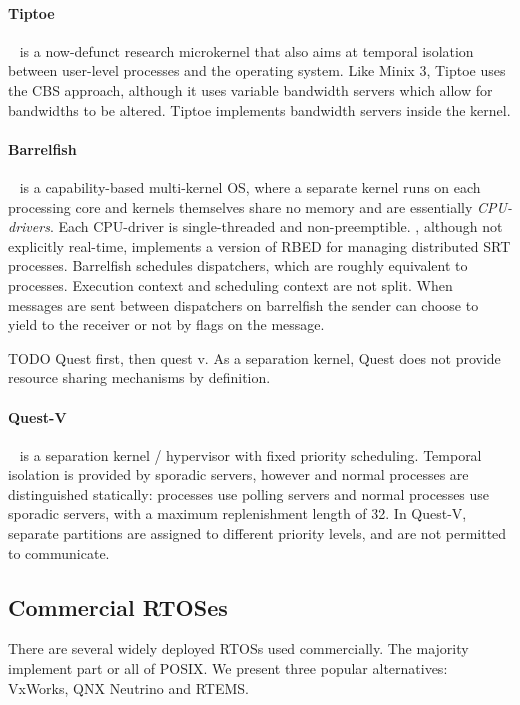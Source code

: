 \paragraph{Tiptoe}~\citep{Craciunas_KPRS_09} is a now-defunct research microkernel that also aims at temporal isolation between user-level processes and the operating system.
Like {\sc Minix 3}, Tiptoe uses the \gls{CBS} approach, although it uses variable bandwidth servers which allow for bandwidths to be altered.
Tiptoe implements bandwidth servers inside the kernel.

\paragraph{Barrelfish}~\citep{Peter_SBBIHR_10} is a capability-based multi-kernel \gls{OS}, where a separate kernel runs on each processing core and kernels themselves share no memory and are essentially \emph{\gls{CPU}-drivers}.
Each CPU-driver is single-threaded and non-preemptible. 
 , although not explicitly real-time, implements a version of \gls{RBED} for managing distributed \gls{SRT} processes.
Barrelfish schedules dispatchers, which are roughly equivalent to processes. 
Execution context and scheduling context are not split.
When messages are sent between dispatchers on barrelfish the sender can choose to yield to the receiver or not by flags on the message.

TODO Quest first, then quest v. 
As a separation kernel, Quest does not provide resource sharing mechanisms by definition. 

\paragraph{Quest-V}~\citep{Danish_LW_11} is a separation kernel / hypervisor with fixed priority scheduling.
Temporal isolation is provided by sporadic servers, however \IO and normal processes are
distinguished statically: \IO processes use polling servers and normal processes use sporadic
servers, with a maximum replenishment length of 32. In Quest-V, separate partitions are assigned to
different priority levels, and are not permitted to communicate. 

\subsection{Commercial RTOSes}
There are several widely deployed \glspl{RTOS} used commercially.  The majority implement part or
all of \gls{POSIX}.  We present three popular alternatives: VxWorks, QNX Neutrino and RTEMS.

